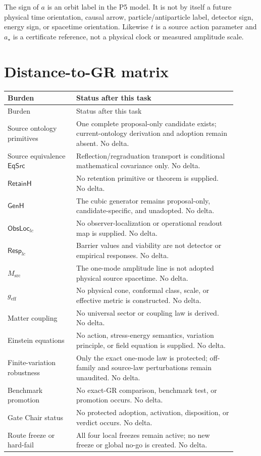 \documentclass[11pt]{article}
\begin{document}
The sign of $a$ is an orbit label in the P5 model.  It is not by itself a
future physical time orientation, causal arrow, particle/antiparticle label,
detector sign, energy sign, or spacetime orientation.  Likewise $t$ is a
source action parameter and $a_\star$ is a certificate reference, not a
physical clock or measured amplitude scale.

\section{Distance-to-GR matrix}

\begin{longtable}{P{0.27\linewidth}P{0.63\linewidth}}
\toprule
Burden & Status after this task \\
\midrule
\endfirsthead
\toprule
Burden & Status after this task \\
\midrule
\endhead
Source ontology primitives & One complete proposal-only candidate exists; current-ontology derivation and adoption remain absent.  No delta.\\
Source equivalence $\mathsf{EqSrc}$ & Reflection/regraduation transport is conditional mathematical covariance only.  No delta.\\
$\mathsf{RetainH}$ & No retention primitive or theorem is supplied.  No delta.\\
$\mathsf{GenH}$ & The cubic generator remains proposal-only, candidate-specific, and unadopted.  No delta.\\
$\mathsf{ObsLoc}_{lc}$ & No observer-localization or operational readout map is supplied.  No delta.\\
$\mathsf{Resp}_{lc}$ & Barrier values and viability are not detector or empirical responses.  No delta.\\
$M_{\mathrm{src}}$ & The one-mode amplitude line is not adopted physical source spacetime.  No delta.\\
$g_{\mathrm{eff}}$ & No physical cone, conformal class, scale, or effective metric is constructed.  No delta.\\
Matter coupling & No universal sector or coupling law is derived.  No delta.\\
Einstein equations & No action, stress-energy semantics, variation principle, or field equation is supplied.  No delta.\\
Finite-variation robustness & Only the exact one-mode law is protected; off-family and source-law perturbations remain unaudited.  No delta.\\
Benchmark promotion & No exact-GR comparison, benchmark test, or promotion occurs.  No delta.\\
Gate Chair status & No protected adoption, activation, disposition, or verdict occurs.  No delta.\\
Route freeze or hard-fail & All four local freezes remain active; no new freeze or global no-go is created.  No delta.\\
\bottomrule
\end{longtable}
\end{document}
